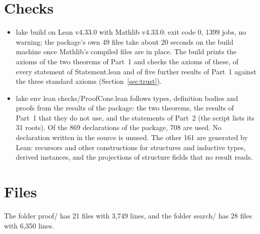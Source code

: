 \documentclass[11pt,a4paper]{article}
\newcommand{\leanus}{\textunderscore\allowbreak}
\newcommand{\lean}[1]{{\ttfamily\let\_\leanus #1}}
\begin{document}
\section{Checks}\label{sec:checks}

\begin{itemize}
\item \lean{lake build} on Lean v4.33.0 with Mathlib v4.33.0: exit code 0,
1399 jobs, no warning; the package's own 49 files take
about 20 seconds on the build machine once Mathlib's compiled files are in
place. The build prints the axioms of the two theorems of Part~1 and checks
the axioms of these, of every statement of \lean{Statement.lean} and of five
further results of Part~1 against the three standard axioms
(Section~\ref{sec:trust}).
\item \lean{lake env lean checks/ProofCone.lean} follows types, definition
bodies and proofs from the results of the package: the two theorems, the
results of Part~1 that they do not use, and the statements of Part~2 (the
script lists its 31 roots). Of the 869 declarations of the
package, 708 are used. No declaration written in the source is unused.
The other 161 are generated by Lean: recursors and other constructions
for structures and inductive types, derived instances, and the projections
of structure fields that no result reads.
\end{itemize}

\section{Files}\label{sec:files}

The folder \lean{proof/} has 21 files with 3,749
lines, and the folder \lean{search/} has 28 files with
6,350 lines.
\end{document}
